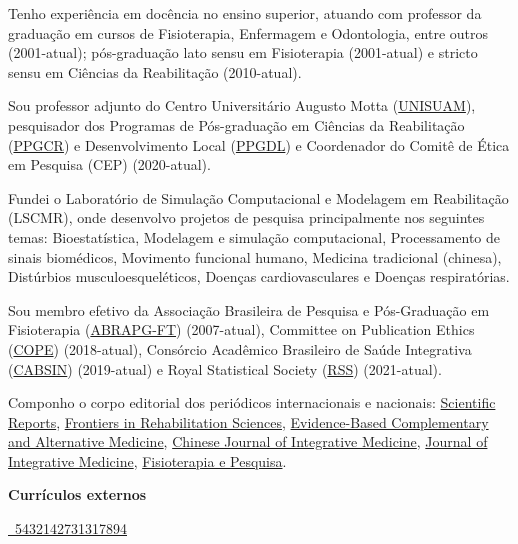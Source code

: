 \documentclass[
]{book}
\begin{document}
Tenho experiência em docência no ensino superior, atuando com professor da graduação em cursos de Fisioterapia, Enfermagem e Odontologia, entre outros (2001-atual); pós-graduação lato sensu em Fisioterapia (2001-atual) e stricto sensu em Ciências da Reabilitação (2010-atual).

Sou professor adjunto do Centro Universitário Augusto Motta (\href{https://www.unisuam.edu.br}{UNISUAM}), pesquisador dos Programas de Pós-graduação em Ciências da Reabilitação (\href{https://www.unisuam.edu.br/programa-pos-graduacao-ciencias-da-reabilitacao}{PPGCR}) e Desenvolvimento Local (\href{https://www.unisuam.edu.br/programa-pos-graduacao-desenvolvimento-local}{PPGDL}) e Coordenador do Comitê de Ética em Pesquisa (CEP) (2020-atual).

Fundei o Laboratório de Simulação Computacional e Modelagem em Reabilitação (LSCMR), onde desenvolvo projetos de pesquisa principalmente nos seguintes temas: Bioestatística, Modelagem e simulação computacional, Processamento de sinais biomédicos, Movimento funcional humano, Medicina tradicional (chinesa), Distúrbios musculoesqueléticos, Doenças cardiovasculares e Doenças respiratórias.

Sou membro efetivo da Associação Brasileira de Pesquisa e Pós-Graduação em Fisioterapia (\href{https://abrapg-ft.org.br/portal/}{ABRAPG-FT}) (2007-atual), Committee on Publication Ethics (\href{https://publicationethics.org}{COPE}) (2018-atual), Consórcio Acadêmico Brasileiro de Saúde Integrativa (\href{https://cabsin.org.br}{CABSIN}) (2019-atual) e Royal Statistical Society (\href{https://rss.org.uk}{RSS}) (2021-atual).

Componho o corpo editorial dos periódicos internacionais e nacionais: \href{https://www.nature.com/srep/about/editors}{Scientific Reports}, \href{https://www.frontiersin.org/research-topics/26395/systemic-effects-and-disabilities-in-long-covid-syndrome-current-approaches-and-clinical-challenges}{Frontiers in Rehabilitation Sciences}, \href{https://www.hindawi.com/journals/ecam/editors/}{Evidence-Based Complementary and Alternative Medicine}, \href{https://www.springer.com/journal/11655/editors}{Chinese Journal of Integrative Medicine}, \href{https://www.journals.elsevier.com/journal-of-integrative-medicine/editorial-board}{Journal of Integrative Medicine}, \href{https://www.scielo.br/journal/fp/about/\#editors}{Fisioterapia e Pesquisa}.

\textbf{Currículos externos}

\href{http://lattes.cnpq.br/5432142731317894}{~5432142731317894}
\end{document}
